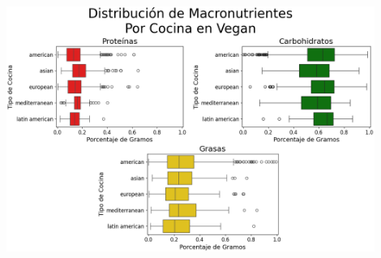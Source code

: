 \documentclass[12pt,a4paper]{article}
\begin{document}
{{            \begin{center}
                \includegraphics[width=0.9\textwidth]{Resources/EDA/Vegan_2.png}
            \end{center}   
        }
    }

    \newpage
\end{document}
